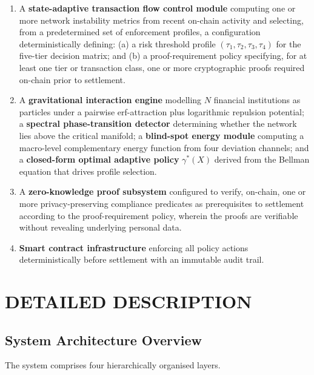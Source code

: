 \documentclass[12pt,a4paper]{article}
\begin{document}
\begin{enumerate}[label=(\roman*)]
\item A \textbf{state-adaptive transaction flow control module} computing
one or more network instability metrics from recent on-chain activity and
selecting, from a predetermined set of enforcement profiles, a
configuration deterministically defining: (a) a risk threshold profile
$(\tau_1,\tau_2,\tau_3,\tau_4)$ for the five-tier decision matrix; and
(b) a proof-requirement policy specifying, for at least one tier or
transaction class, one or more cryptographic proofs required on-chain
prior to settlement.

\item A \textbf{gravitational interaction engine} modelling $N$ financial
institutions as particles under a pairwise erf-attraction plus logarithmic
repulsion potential; a \textbf{spectral phase-transition detector}
determining whether the network lies above the critical manifold; a
\textbf{blind-spot energy module} computing a macro-level complementary
energy function from four deviation channels; and a \textbf{closed-form
optimal adaptive policy} $\gamma^*(X)$ derived from the Bellman equation
that drives profile selection.

\item A \textbf{zero-knowledge proof subsystem} configured to verify, on-chain,
one or more privacy-preserving compliance predicates as prerequisites to
settlement according to the proof-requirement policy, wherein the proofs are
verifiable without revealing underlying personal data.

\item \textbf{Smart contract infrastructure} enforcing all policy actions
deterministically before settlement with an immutable audit trail.

\end{enumerate}

\section{DETAILED DESCRIPTION}

\subsection{System Architecture Overview}
\label{sec:arch}

The system comprises four hierarchically organised layers.
\end{document}
